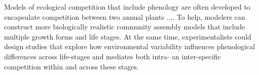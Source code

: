 Models of ecological competition that include phenology are often developed to encapsulate competition between two annual plants \citep{godoy2014,wolkovich2021phenological,levine2022competition}....
To help, modelers can construct more biologically realistic community assembly models that include multiple growth forms and life stages. At the same time, experimentalists could design studies that explore how environmental variability influences phenological differences across life-stages and mediates both intra- an inter-specific competition within and across these stages.


